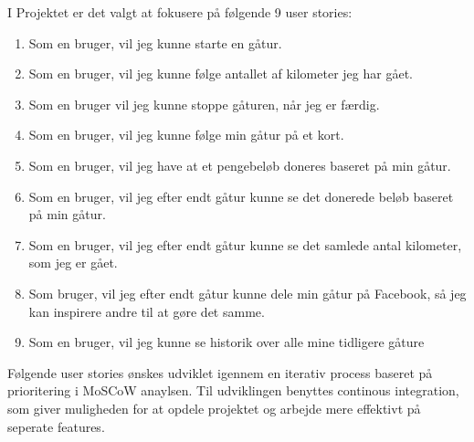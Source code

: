 I Projektet er det valgt at fokusere på følgende 9 user stories:
\begin{enumerate}

\item Som en bruger, vil jeg kunne starte en gåtur.
\item Som en bruger, vil jeg kunne følge antallet af kilometer jeg har gået. 
\item Som en bruger vil jeg kunne stoppe gåturen, når jeg er færdig. 
\item Som en bruger, vil jeg kunne følge min gåtur på et kort. 
\item Som en bruger, vil jeg have at et pengebeløb doneres baseret på min gåtur. 
\item Som en bruger, vil jeg efter endt gåtur kunne se det donerede beløb baseret på min gåtur. 
\item Som en bruger, vil jeg efter endt gåtur kunne se det samlede antal kilometer, som jeg er gået. 
\item Som bruger, vil jeg efter endt gåtur kunne dele min gåtur på Facebook, så jeg kan inspirere andre til at gøre det samme. 
\item Som en bruger, vil jeg kunne se historik over alle mine tidligere gåture
\end{enumerate}

\noindent Følgende user stories ønskes udviklet igennem en iterativ process baseret på prioritering i MoSCoW anaylsen. Til udviklingen benyttes continous integration, som giver muligheden for at opdele projektet og arbejde mere effektivt på seperate features.